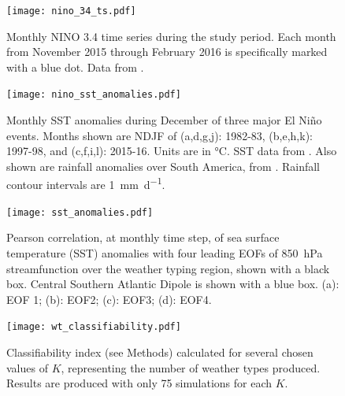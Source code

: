 \documentclass{article}
\begin{document}
\begin{figure}
	\texttt{[image: nino\_34\_ts.pdf]}
	\caption{
		Monthly NINO 3.4 time series during the study period.
		Each month from November 2015 through February 2016 is specifically marked with a blue dot.
		Data from \citet{Kaplan1998}.
	}
\end{figure}

\begin{figure}
	\texttt{[image: nino\_sst\_anomalies.pdf]}
	\caption{
		Monthly SST anomalies during December of three major El Ni\~{n}o events.
		Months shown are NDJF of (a,d,g,j): 1982-83, (b,e,h,k): 1997-98, and (c,f,i,l): 2015-16.
		Units are in \si{\celsius}.
		SST data from \citet{Reynolds2002}.
		Also shown are rainfall anomalies over South America, from \citet{Chen2008}.
		Rainfall contour intervals are \SI{1}{\milli\meter\per\day}.
	}
\end{figure}

\begin{figure}
	\noindent\texttt{[image: sst\_anomalies.pdf]}
	\caption{
		Pearson correlation, at monthly time step, of  sea surface temperature (SST) anomalies \citep{Reynolds2002} with four leading EOFs of \SI{850}{\hecto\pascal} streamfunction over the weather typing region, shown with a black box.
		Central Southern Atlantic Dipole is shown with a blue box.
		(a): EOF 1; (b): EOF2; (c): EOF3; (d): EOF4.
	}\label{fig:sst-anomalies}
\end{figure}


\begin{figure}
	\texttt{[image: wt\_classifiability.pdf]}
	\caption{
		Classifiability index (see Methods) calculated for several chosen values of $K$, representing the number of weather types produced.
		Results are produced with only 75 simulations for each $K$.
	}
\end{figure}

\clearpage


\end{document}
